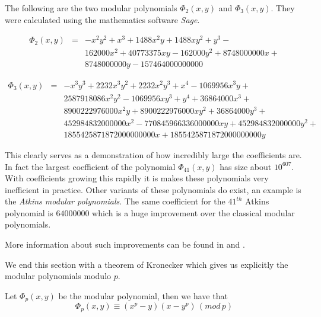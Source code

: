 \begin{ex}
 The following are the two modular polynomials $\Phi_2(x,y)$ and $\Phi_3(x,y)$. They were
calculated using the mathematics software \emph{Sage}. 

\begin{eqnarray}
 \Phi_2(x,y) &=& -x^2y^2 + x^3 + 1488x^2y + 1488xy^2 + y^3 -\nonumber \\
	      && 162000x^2 + 40773375xy - 162000y^2 + 8748000000x +\nonumber \\
	      && 8748000000y - 157464000000000 \nonumber
\end{eqnarray}

\begin{eqnarray}
  \Phi_3(x,y) &=& -x^3y^3 + 2232x^3y^2 + 2232x^2y^3 + x^4 - 1069956x^3y +\nonumber \\
	      &&  2587918086x^2y^2-1069956xy^3 + y^4 + 36864000x^3 + \nonumber \\ 
	      &&  8900222976000x^2y + 8900222976000xy^2+36864000y^3 +\nonumber \\
	      &&  452984832000000x^2 - 770845966336000000xy + 452984832000000y^2+\nonumber \\
	      &&  1855425871872000000000x + 1855425871872000000000y \nonumber
\end{eqnarray}

This clearly serves as a demonstration of how incredibly large the coefficients are. In fact the largest
coefficient of the polynomial $\Phi_{41}(x,y)$ has size about $10^{607}$. With coefficients growing this
rapidly it is makes these polynomials very inefficient in practice. Other variants of these polynomials
do exist, an example is the \emph{Atkins modular polynomials}. The same coefficient for the $41^{th}$ Atkins
polynomial is $64000000$ which is a huge improvement over the classical modular polynomials.

More information about such improvements can be found in \cite{Handbook} and \cite{Blake}.
\end{ex}


We end this section with a theorem of Kronecker which gives us explicitly the modular polynomials
modulo $p$.
\begin{thm} \label{kroenecker}
 Let $\Phi_p(x,y)$ be the modular polynomial, then we have that
$$ \Phi_p(x,y) \equiv (x^p-y)(x-y^p)\,(mod\,p)$$
\end{thm}
